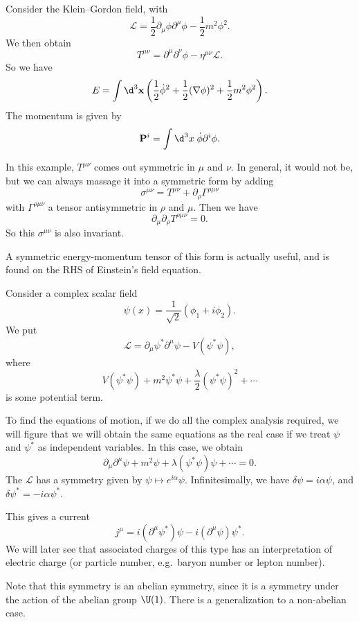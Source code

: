 \documentclass[a4paper]{article}
\begin{document}
\begin{eg}
  Consider the Klein--Gordon field, with
  \[
    \mathcal{L} = \frac{1}{2} \partial_\mu \phi \partial^\mu \phi - \frac{1}{2}m^2 \phi^2.
  \]
  We then obtain
  \[
    T^{\mu\nu} = \partial^\mu \partial^\nu \phi - \eta^{\mu\nu} \mathcal{L}.
  \]
  So we have
  \[
    E = \int \d^3 \mathbf{x} \left(\frac{1}{2}\dot{\phi}^2 + \frac{1}{2}(\nabla \phi)^2 + \frac{1}{2}m^2 \phi^2\right).
  \]
  The momentum is given by
  \[
    \mathbf{P}^i = \int\d^3 x\; \dot{\phi} \partial^i \phi.
  \]
\end{eg}
In this example, $T^{\mu\nu}$ comes out symmetric in $\mu$ and $\nu$. In general, it would not be, but we can always massage it into a symmetric form by adding
\[
  \sigma^{\mu\nu} = T^{\mu\nu} + \partial_\rho \Gamma^{\rho\mu\nu}
\]
with $\Gamma^{\rho\mu\nu}$ a tensor antisymmetric in $\rho$ and $\mu$. Then we have
\[
  \partial_\mu \partial_\rho T^{\rho\mu\nu} = 0.
\]
So this $\sigma^{\mu\nu}$ is also invariant.

A symmetric energy-momentum tensor of this form is actually useful, and is found on the RHS of Einstein's field equation.

\begin{eg}
  Consider a complex scalar field
  \[
    \psi(x) = \frac{1}{\sqrt{2}} (\phi_1 + i \phi_2).
  \]
  We put
  \[
    \mathcal{L} = \partial_\mu \psi^* \partial^\mu \psi - V(\psi^*\psi),
  \]
  where
  \[
    V (\psi^*\psi) + m^2 \psi^* \psi + \frac{\lambda}{2}(\psi^*\psi)^2 + \cdots
  \]
  is some potential term.

  To find the equations of motion, if we do all the complex analysis required, we will figure that we will obtain the same equations as the real case if we treat $\psi$ and $\psi^*$ as independent variables. In this case, we obtain
  \[
    \partial_\mu \partial^\mu \psi + m^2 \psi + \lambda (\psi^*\psi) \psi + \cdots = 0.
  \]
  The $\mathcal{L}$ has a symmetry given by $\psi \mapsto e^{i\alpha} \psi$. Infinitesimally, we have $\delta \psi = i\alpha \psi$, and $\delta \psi^* = -i\alpha \psi^*$.

  This gives a current
  \[
    j^\mu = i(\partial^\mu \psi^*) \psi - i (\partial^\mu \psi)\psi^*.
  \]
  We will later see that associated charges of this type has an interpretation of electric charge (or particle number, e.g.\ baryon number or lepton number).
\end{eg}

Note that this symmetry is an abelian symmetry, since it is a symmetry under the action of the abelian group $\U(1)$. There is a generalization to a non-abelian case.
\end{document}
